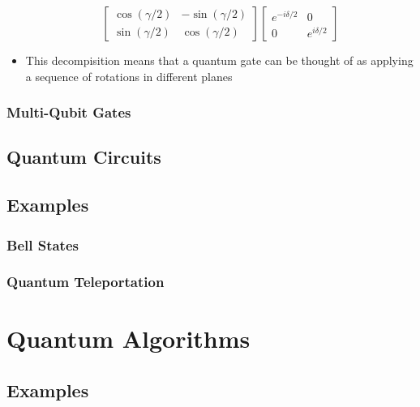 \documentclass{article}
\begin{document}
\begin{itemize}
\begin{equation}
                    \begin{bmatrix}
                        \cos(\gamma /2) & - \sin(\gamma / 2) \\
                        \sin(\gamma / 2) & \cos(\gamma / 2)
                    \end{bmatrix}
                    \begin{bmatrix}
                        e^{-i \delta /2} & 0 \\
                        0               & e^{i \delta / 2}
                    \end{bmatrix} 
                \end{equation}
                \item This decompisition means that a quantum gate can be thought of as applying a sequence of rotations in different planes
            \end{itemize}

        \subsubsection{Multi-Qubit Gates}

            

    \subsection{Quantum Circuits}

    \subsection{Examples}

        \subsubsection{Bell States}

        \subsubsection{Quantum Teleportation}

\section{Quantum Algorithms}

    \subsection{Examples}
\end{document}
